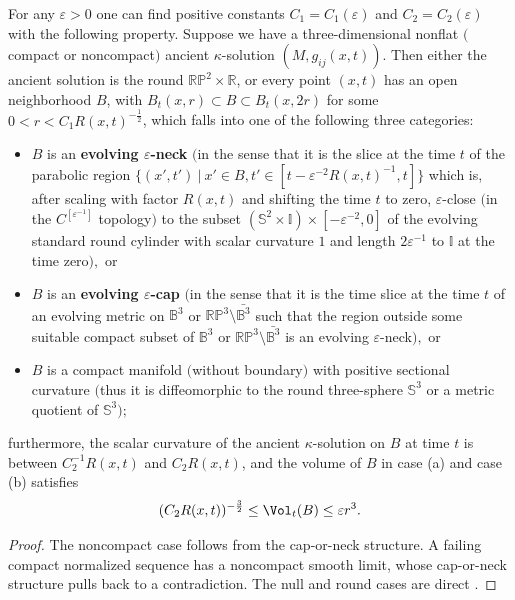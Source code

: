 \begin{theorem}
  \label{thm:cz-ancient-kappa-canonical-neighborhoods}
 For any $\varepsilon>0$ one can find
positive constants $C_1=C_1(\varepsilon)$ and
$C_2=C_2(\varepsilon)$ with the following property. Suppose we
have a three-dimensional nonflat $($compact or noncompact$)$
ancient $\kappa$-solution $(M,g_{ij}(x,t))$. Then either the
ancient solution is the round $\mathbb{R}\mathbb{P}^2 \times
\mathbb{R}$, or every point $(x,t)$ has an open neighborhood $B$,
with $B_t(x,r)\subset B \subset B_t(x,2r)$ for some
$0<r<C_1R(x,t)^{-\frac{1}{2}}$, which falls into one of the
following three categories:
\begin{itemize}
\item[(a)] $B$ is an {\bf evolving $\varepsilon$-neck} $($in the
sense that it is the slice at the time $t$ of the parabolic region
$\{(x',t')\ |\ x' \in B, t' \in [t - \varepsilon^{-2}R(x,t)^{-1},
t] \}$ which is, after scaling with factor $R(x,t)$ and shifting
the time $t$ to zero, $\varepsilon$-close $($in the
$C^{[\varepsilon^{-1}]}$ topology$)$ to the subset
$(\mathbb{S}^2\times \mathbb{I})\times [-\varepsilon^{-2},0]$ of
the evolving standard round cylinder with scalar curvature $1$ and
length $2\varepsilon^{-1}$ to $\mathbb{I}$ at the time zero$),$ or
 \item[(b)] $B$ is an {\bf
evolving $\varepsilon$-cap} $($in the sense that it is the time
slice at the time $t$ of an evolving metric on $\mathbb{B}^3$ or
$\mathbb{R}\mathbb{P}^3\setminus\bar{\mathbb{B}^3}$ such that the
region outside some suitable compact subset of $\mathbb{B}^3$ or
$\mathbb{R}\mathbb{P}^3\setminus\bar{\mathbb{B}^3}$ is an evolving
$\varepsilon$-neck$),$ or 
\item[(c)] $B$ is a compact manifold $($without boundary$)$ with
positive sectional curvature $($thus it is diffeomorphic to the
round three-sphere $\mathbb{S}^3$ or a metric quotient of
$\mathbb{S}^3);$
\end{itemize}
furthermore, the scalar curvature of the ancient $\kappa$-solution
on $B$ at time $t$ is between $C_2^{-1}R(x,t)$ and $C_2R(x,t)$,
and the volume of $B$ in case {\rm (a)} and case {\rm (b)}
satisfies
$$
(C_2R(x,t))^{-\frac{3}{2}} \leq \Vol_t(B) \leq \varepsilon r^3.
$$
\end{theorem}
\begin{proof}
\sketch The noncompact case follows from the cap-or-neck structure.
A failing compact normalized sequence has a noncompact smooth limit,
whose cap-or-neck structure pulls back to a contradiction.  The null
and round cases are direct \cite{P2, CZ05F}.
\end{proof}
